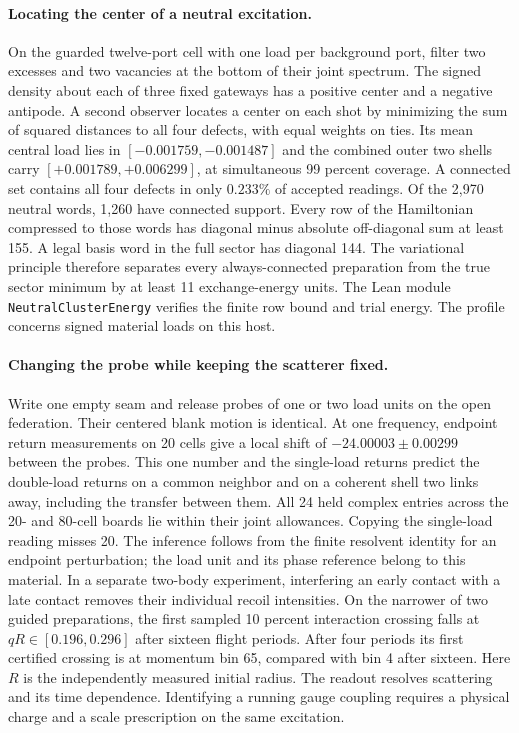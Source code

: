 \documentclass[11pt]{article}
\theoremstyle{definition}
\theoremstyle{remark}
\theoremstyle{plain}
\begin{document}
\paragraph{Locating the center of a neutral excitation.}
On the guarded twelve-port cell with one load per background port,
filter two excesses and two vacancies at the bottom of their joint
spectrum. The signed density about each of three fixed gateways has a
positive center and a negative antipode. A second observer locates a
center on each shot by minimizing the sum of squared distances to all
four defects, with equal weights on ties. Its mean central load lies
in $[-0.001759,-0.001487]$ and the combined outer two shells carry
$[+0.001789,+0.006299]$, at simultaneous 99 percent coverage.
A connected set contains all four defects in only $0.233\%$ of
accepted readings. Of the 2,970 neutral words, 1,260 have connected
support. Every row of the Hamiltonian compressed to those words has
diagonal minus absolute off-diagonal sum at least 155. A legal basis
word in the full sector has diagonal 144. The variational principle
therefore separates every always-connected preparation from the true
sector minimum by at least 11 exchange-energy units. The Lean module \texttt{NeutralClusterEnergy} verifies the
finite row bound and trial energy. The profile concerns signed material
loads on this host.

\paragraph{Changing the probe while keeping the scatterer fixed.}
Write one empty seam and release probes of one or two load units on
the open federation. Their centered blank motion is identical.
At one frequency, endpoint return measurements on 20 cells give a
local shift of $-24.00003\pm0.00299$ between the probes. This one
number and the single-load returns predict the double-load returns
on a common neighbor and on a coherent shell two links away, including
the transfer between them. All 24 held complex entries across the
20- and 80-cell boards lie within their joint allowances. Copying
the single-load reading misses 20. The inference follows from the
finite resolvent identity for an endpoint perturbation; the load unit
and its phase reference belong to this material. In a separate
two-body experiment, interfering an early contact with a late contact
removes their individual recoil intensities. On the narrower of two
guided preparations, the first sampled 10 percent interaction crossing
falls at $qR\in[0.196,0.296]$ after sixteen flight periods.
After four periods its first certified crossing is at momentum bin 65,
compared with bin 4 after sixteen. Here $R$ is the independently
measured initial radius. The readout resolves scattering and its time
dependence. Identifying a running gauge coupling requires a physical
charge and a scale prescription on the same excitation.
\end{document}
